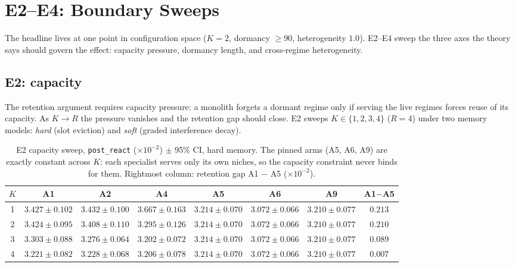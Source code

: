 \section{E2--E4: Boundary Sweeps}
\label{sec:dd5-sweeps}

The headline lives at one point in configuration space ($K=2$, dormancy
$\ge 90$, heterogeneity $1.0$). E2--E4 sweep the three axes the theory says
should govern the effect: capacity pressure, dormancy length, and
cross-regime heterogeneity.

\subsection{E2: capacity}
\label{sec:dd5-e2}

The retention argument requires capacity pressure: a monolith forgets a
dormant regime only if serving the live regimes forces reuse of its
capacity. As $K \to R$ the pressure vanishes and the retention gap should
close. E2 sweeps $K \in \{1,2,3,4\}$ ($R = 4$) under two memory models:
\emph{hard} (slot eviction) and \emph{soft} (graded interference decay).

\begin{table}[h]
\centering
\caption{E2 capacity sweep, \texttt{post\_react} ($\times 10^{-2}$) $\pm$
95\% CI, hard memory. The pinned arms (A5, A6, A9) are exactly constant
across $K$: each specialist serves only its own niches, so the capacity
constraint never binds for them. Rightmost column: retention gap
A1 $-$ A5 ($\times 10^{-2}$).}
\label{tab:dd5-e2-hard}
\small
\begin{tabular}{cccccccc}
\toprule
$K$ & A1 & A2 & A4 & A5 & A6 & A9 & A1$-$A5 \\
\midrule
1 & $3.427 \pm 0.102$ & $3.432 \pm 0.100$ & $3.667 \pm 0.163$ & $3.214 \pm 0.070$ & $3.072 \pm 0.066$ & $3.210 \pm 0.077$ & $0.213$ \\
2 & $3.424 \pm 0.095$ & $3.408 \pm 0.110$ & $3.295 \pm 0.126$ & $3.214 \pm 0.070$ & $3.072 \pm 0.066$ & $3.210 \pm 0.077$ & $0.210$ \\
3 & $3.303 \pm 0.088$ & $3.276 \pm 0.064$ & $3.202 \pm 0.072$ & $3.214 \pm 0.070$ & $3.072 \pm 0.066$ & $3.210 \pm 0.077$ & $0.089$ \\
4 & $3.221 \pm 0.082$ & $3.228 \pm 0.068$ & $3.206 \pm 0.078$ & $3.214 \pm 0.070$ & $3.072 \pm 0.066$ & $3.210 \pm 0.077$ & $0.007$ \\
\bottomrule
\end{tabular}
\end{table}

